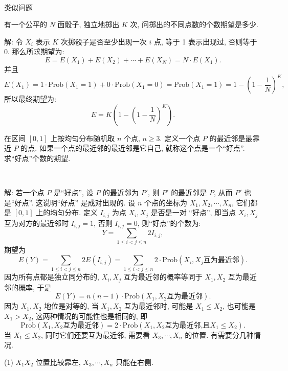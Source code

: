 ~

\noindent 类似问题

有一个公平的 $N$ 面骰子, 独立地掷出 $K$ 次, 问掷出的不同点数的个数期望是多少.

解: 令 $X_i$ 表示 $K$ 次掷骰子是否至少出现一次 $i$ 点, 等于 1 表示出现过, 否则等于 0. 那么所求期望为:
\[E = E(X_1)+E(X_2)+\cdots+E(X_N) = N\cdot E(X_1) .\]
并且
\[
E(X_1) = 1\cdot\mathrm{Prob}(X_1=1)+0\cdot\mathrm{Prob}(X_1=0) = \mathrm{Prob}(X_1=1) = 1-(1-\frac{1}{N})^K ,
\]
所以最终期望为:
\[E = K\left(1-(1-\frac{1}{N})^K \right) .\]


\newpage

在区间 $[0,1]$ 上按均匀分布随机取 $n$ 个点, $n \ge 3$. 定义一个点 $P$ 的最近邻是最靠近 $P$ 的点. 如果一个点的最近邻的最近邻是它自己, 就称这个点是一个``好点''. 求``好点''个数的期望.

~

解: 若一个点 $P$ 是``好点'', 设 $P$ 的最近邻为 $P'$, 则 $P'$ 的最近邻是 $P$, 从而 $P'$ 也是``好点''. 这说明``好点'' 是成对出现的. 设 $n$ 个点的坐标为 $X_1, X_2, \cdots, X_n$, 它们都是 $[0,1]$ 上的均匀分布. 定义 $I_{i,j}$ 为点 $X_i, X_j$ 是否是一对 ``好点'', 即当点 $X_i, X_j$ 互为对方的最近邻时 $I_{i,j} = 1$, 否则 $I_{i,j}=0$, 则``好点''的个数为:
\[ Y = \sum_{1\le i < j \le n}{2I_{i,j}}, \]
期望为
\[ E(Y) = \sum_{1\le i < j \le n}{2E(I_{i,j})} = \sum_{1\le i < j \le n}{2\cdot\mathrm{Prob}(X_i,X_j\text{互为最近邻})} .\]
因为所有点都是独立同分布的, $X_i,X_j$ 互为最近邻的概率等同于 $X_1, X_2$ 互为最近邻的概率, 于是
\[E(Y) = n(n-1)\cdot\mathrm{Prob}(X_1,X_2\text{互为最近邻}) .\]
因为 $X_1, X_2$ 地位是对等的, 当 $X_1,X_2$ 互为最近邻时, 可能是 $X_1 \le X_2$, 也可能是 $X_1 > X_2$, 这两种情况的可能性也是相同的, 即
\[\mathrm{Prob}(X_1,X_2\text{互为最近邻}) = 2\cdot\mathrm{Prob}(X_1,X_2\text{互为最近邻,且}X_1 \le X_2) .\]
当 $X_1 \le X_2$, 同时它们还要互为最近邻, 需要看 $X_3, \cdots, X_n$ 的位置. 有需要分几种情况.

(1) $X_1X_2$ 位置比较靠左, $X_3, \cdots, X_n$ 只能在右侧.
\begin{figure}[htbp]
\centering
{}
\end{figure}

